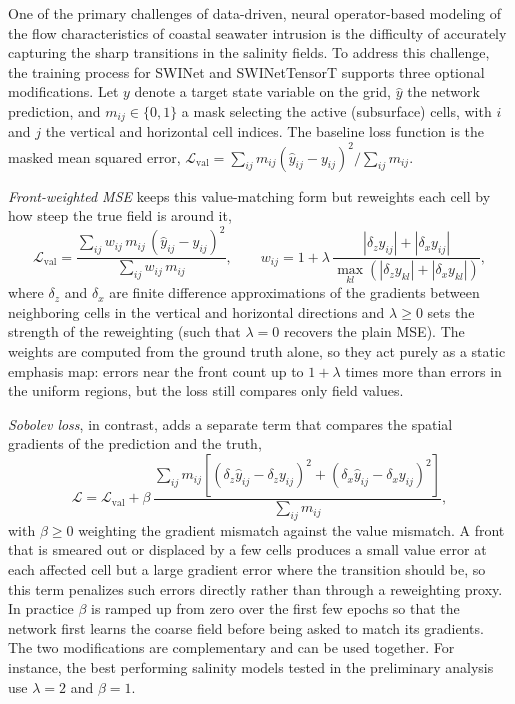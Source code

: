 One of the primary challenges of data-driven, neural operator-based modeling of the flow characteristics of coastal seawater intrusion is the difficulty of accurately capturing the sharp transitions in the salinity fields. To address this challenge, the training process for SWINet and SWINetTensorT supports three optional modifications. Let $y$ denote a target state variable on the grid, $\hat{y}$ the network prediction, and $m_{ij}\in\{0,1\}$ a mask selecting the active (subsurface) cells, with $i$ and $j$ the vertical and horizontal cell indices. The baseline loss function is the masked mean squared error,
$\mathcal{L}_{\mathrm{val}} = \sum_{ij} m_{ij}(\hat{y}_{ij}-y_{ij})^2 \big/ \sum_{ij} m_{ij}$.

\emph{Front-weighted MSE} keeps this value-matching form but reweights each cell by how steep the true field is around it,
\begin{equation}
  \mathcal{L}_{\mathrm{val}} =
  \frac{\sum_{ij} w_{ij}\, m_{ij}\,(\hat{y}_{ij}-y_{ij})^2}{\sum_{ij} w_{ij}\, m_{ij}},
  \qquad
  w_{ij} = 1 + \lambda\,\frac{|\delta_z y_{ij}| + |\delta_x y_{ij}|}{\max_{kl}\left(|\delta_z y_{kl}| + |\delta_x y_{kl}|\right)},
  \label{eq:front-weight}
\end{equation}
where $\delta_z$ and $\delta_x$ are finite difference approximations of the gradients between neighboring cells in the vertical and horizontal directions and $\lambda\ge 0$ sets the strength of the reweighting (such that $\lambda=0$ recovers the plain MSE). The weights are computed from the ground truth alone, so they act purely as a static emphasis map: errors near the front count up to $1+\lambda$ times more than errors in the uniform regions, but the loss still compares only field values.

\emph{Sobolev loss}, in contrast, adds a separate term that compares the spatial gradients of the prediction and the truth,
\begin{equation}
  \mathcal{L} = \mathcal{L}_{\mathrm{val}} + \beta\,
  \frac{\sum_{ij} m_{ij}\left[(\delta_z\hat{y}_{ij}-\delta_z y_{ij})^2 + (\delta_x\hat{y}_{ij}-\delta_x y_{ij})^2\right]}{\sum_{ij} m_{ij}},
  \label{eq:sobolev}
\end{equation}
with $\beta\ge0$ weighting the gradient mismatch against the value mismatch. A front that is smeared out or displaced by a few cells produces a small value error at each affected cell but a large gradient error where the transition should be, so this term penalizes such errors directly rather than through a reweighting proxy. In practice $\beta$ is ramped up from zero over the first few epochs so that the network first learns the coarse field before being asked to match its gradients. The two modifications are complementary and can be used together. For instance, the best performing salinity models tested in the preliminary analysis use $\lambda=2$ and $\beta=1$.

